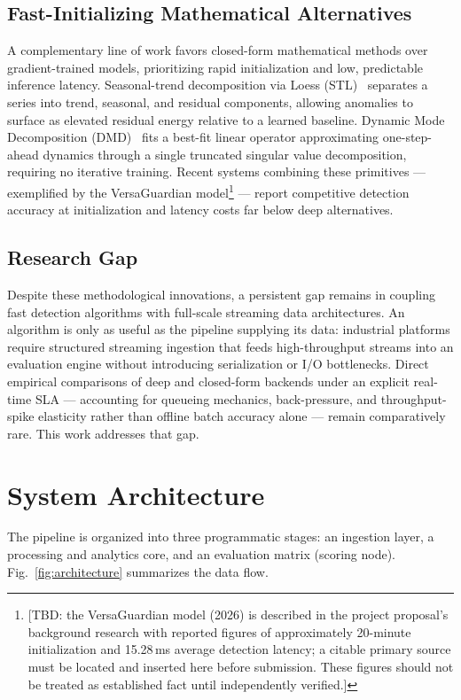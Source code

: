 \subsection{Fast-Initializing Mathematical Alternatives}
A complementary line of work favors closed-form mathematical methods over
gradient-trained models, prioritizing rapid initialization and low,
predictable inference latency. Seasonal-trend decomposition via
Loess (STL)~\cite{cleveland1990stl} separates a series into trend,
seasonal, and residual components, allowing anomalies to surface as
elevated residual energy relative to a learned baseline. Dynamic Mode
Decomposition (DMD)~\cite{schmid2010dmd} fits a best-fit linear operator
approximating one-step-ahead dynamics through a single truncated singular
value decomposition, requiring no iterative training. Recent systems
combining these primitives --- exemplified by the VersaGuardian
model\footnote{[TBD: the VersaGuardian model (2026) is described in the
project proposal's background research with reported figures of
approximately 20-minute initialization and 15.28\,ms average detection
latency; a citable primary source must be located and inserted here before
submission. These figures should not be treated as established fact until
independently verified.]} --- report competitive detection accuracy at
initialization and latency costs far below deep alternatives.

\subsection{Research Gap}
Despite these methodological innovations, a persistent gap remains in
coupling fast detection algorithms with full-scale streaming data
architectures. An algorithm is only as useful as the pipeline supplying its
data: industrial platforms require structured streaming ingestion that
feeds high-throughput streams into an evaluation engine without introducing
serialization or I/O bottlenecks. Direct empirical comparisons of deep and
closed-form backends under an explicit real-time SLA --- accounting for
queueing mechanics, back-pressure, and throughput-spike elasticity rather
than offline batch accuracy alone --- remain comparatively rare. This work
addresses that gap.

\section{System Architecture}
The pipeline is organized into three programmatic stages: an ingestion
layer, a processing and analytics core, and an evaluation matrix
(scoring node). Fig.~\ref{fig:architecture} summarizes the data flow.

